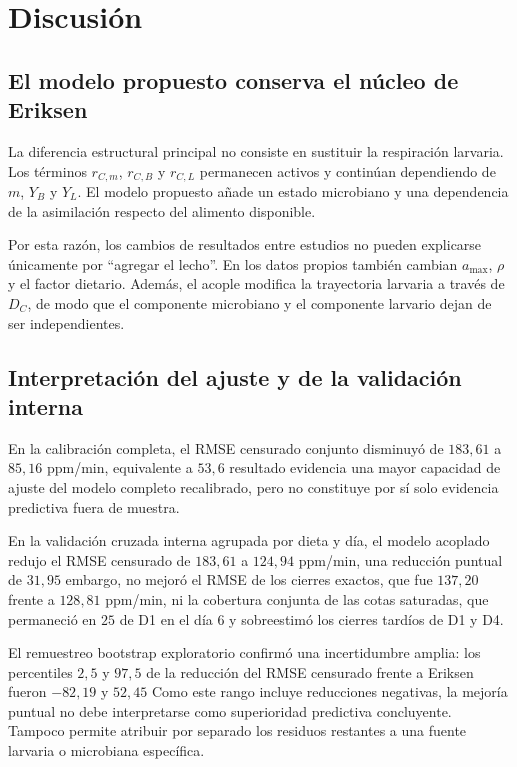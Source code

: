 \section{Discusión}

\subsection{El modelo propuesto conserva el núcleo de Eriksen}

La diferencia estructural principal no consiste en sustituir la
respiración larvaria. Los términos $r_{C,m}$, $r_{C,B}$ y $r_{C,L}$
permanecen activos y continúan dependiendo de $m$, $Y_B$ y $Y_L$. El
modelo propuesto añade un estado microbiano y una dependencia de la
asimilación respecto del alimento disponible.

Por esta razón, los cambios de resultados entre estudios no pueden
explicarse únicamente por ``agregar el lecho''. En los datos propios
también cambian $a_{\max}$, $\rho$ y el factor dietario. Además, el
acople modifica la trayectoria larvaria a través de $D_C$, de modo que
el componente microbiano y el componente larvario dejan de ser
independientes.

\subsection{Interpretación del ajuste y de la validación interna}

En la calibración completa, el RMSE censurado conjunto disminuyó de
$183{,}61$ a $85{,}16$ ppm/min, equivalente a $53{,}6$ %
resultado evidencia una mayor capacidad de ajuste del modelo completo
recalibrado, pero no constituye por sí solo evidencia predictiva fuera
de muestra.

En la validación cruzada interna agrupada por dieta y día, el modelo
acoplado redujo el RMSE censurado de $183{,}61$ a $124{,}94$ ppm/min,
una reducción puntual de $31{,}95$ %
embargo, no mejoró el RMSE de los cierres exactos, que fue $137{,}20$
frente a $128{,}81$ ppm/min, ni la cobertura conjunta de las cotas
saturadas, que permaneció en $25$ %
de D1 en el día 6 y sobreestimó los cierres tardíos de D1 y D4.

El remuestreo bootstrap exploratorio confirmó una incertidumbre amplia:
los percentiles $2{,}5$ y $97{,}5$ de la reducción del RMSE censurado
frente a Eriksen fueron $-82{,}19$ y $52{,}45$ %
Como este rango incluye reducciones negativas, la mejoría puntual no
debe interpretarse como superioridad predictiva concluyente. Tampoco
permite atribuir por separado los residuos restantes a una fuente
larvaria o microbiana específica.

